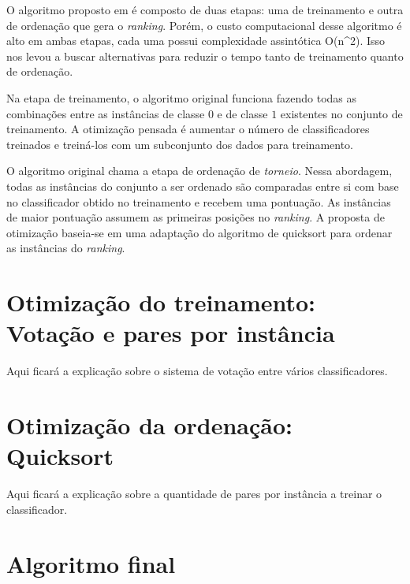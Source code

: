 O algoritmo proposto em \cite{langford08} é composto de duas etapas: uma de treinamento e outra de ordenação que gera o \emph{ranking}. Porém, o custo computacional desse algoritmo é alto em ambas etapas, cada uma possui complexidade assintótica O(n^2). Isso nos levou a buscar alternativas para reduzir o tempo tanto de treinamento quanto de ordenação.

Na etapa de treinamento, o algoritmo original funciona fazendo todas as combinações entre as instâncias de classe $0$ e de classe $1$ existentes no conjunto de treinamento. A otimização pensada é aumentar o número de classificadores treinados e treiná-los com um subconjunto dos dados para treinamento.

O algoritmo original chama a etapa de ordenação de \emph{torneio}. Nessa abordagem, todas as instâncias do conjunto a ser ordenado são comparadas entre si com base no classificador obtido no treinamento e recebem uma pontuação. As instâncias de maior pontuação assumem as primeiras posições no \emph{ranking}. A proposta de otimização baseia-se em uma adaptação do algoritmo de quicksort para ordenar as instâncias do \emph{ranking}.

\section{Otimização do treinamento: Votação e pares por instância}
Aqui ficará a explicação sobre o sistema de votação entre vários classificadores.

\section{Otimização da ordenação: Quicksort}
Aqui ficará a explicação sobre a quantidade de pares por instância a treinar o classificador.

\section{Algoritmo final}
